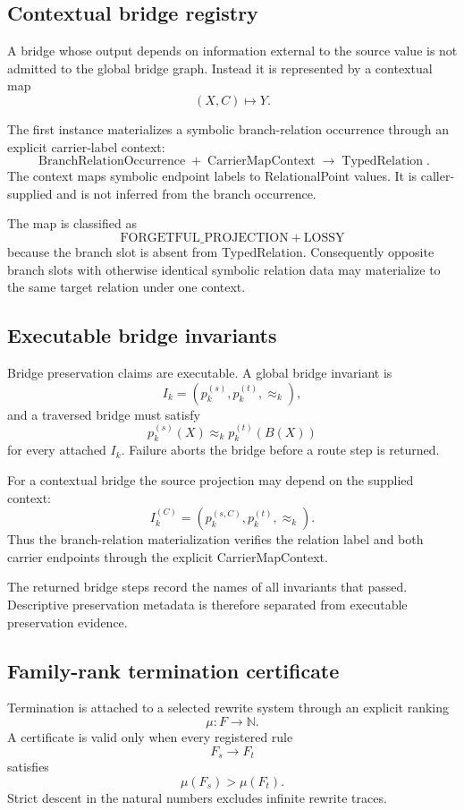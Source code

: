 \documentclass[11pt]{article}
\begin{document}
\subsection{Contextual bridge registry}

A bridge whose output depends on information external to the source value is
not admitted to the global bridge graph. Instead it is represented by a
contextual map
\[
(X,C)\longmapsto Y.
\]

The first instance materializes a symbolic branch-relation occurrence through
an explicit carrier-label context:
\[
\operatorname{BranchRelationOccurrence}
+
\operatorname{CarrierMapContext}
\longrightarrow
\operatorname{TypedRelation}.
\]
The context maps symbolic endpoint labels to RelationalPoint values. It is
caller-supplied and is not inferred from the branch occurrence.

The map is classified as
\[
\boxed{
\mathrm{FORGETFUL\_PROJECTION}
+
\mathrm{LOSSY}
}
\]
because the branch slot is absent from TypedRelation. Consequently opposite
branch slots with otherwise identical symbolic relation data may materialize
to the same target relation under one context.

\subsection{Executable bridge invariants}

Bridge preservation claims are executable. A global bridge invariant is
\[
I_k=(p_k^{(s)},p_k^{(t)},\approx_k),
\]
and a traversed bridge must satisfy
\[
p_k^{(s)}(X)
\approx_k
p_k^{(t)}(B(X))
\]
for every attached \(I_k\). Failure aborts the bridge before a route step is
returned.

For a contextual bridge the source projection may depend on the supplied
context:
\[
I_k^{(C)}=(p_k^{(s,C)},p_k^{(t)},\approx_k).
\]
Thus the branch-relation materialization verifies the relation label and both
carrier endpoints through the explicit CarrierMapContext.

The returned bridge steps record the names of all invariants that passed.
Descriptive preservation metadata is therefore separated from executable
preservation evidence.

\subsection{Family-rank termination certificate}

Termination is attached to a selected rewrite system through an explicit
ranking
\[
\mu:F\to\mathbb N.
\]
A certificate is valid only when every registered rule
\[
F_s\to F_t
\]
satisfies
\[
\mu(F_s)>\mu(F_t).
\]
Strict descent in the natural numbers excludes infinite rewrite traces.
\end{document}
